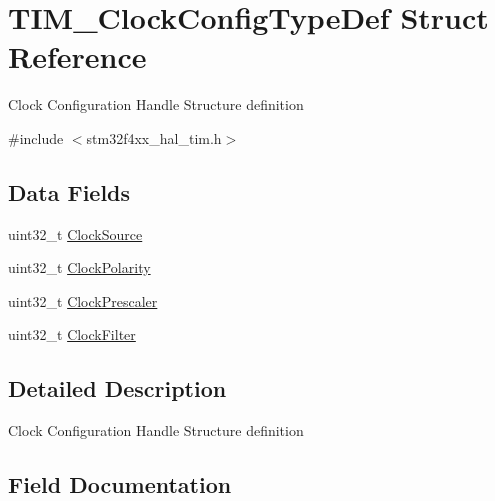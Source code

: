 \hypertarget{struct_t_i_m___clock_config_type_def}{}\section{T\+I\+M\+\_\+\+Clock\+Config\+Type\+Def Struct Reference}
\label{struct_t_i_m___clock_config_type_def}


Clock Configuration Handle Structure definition ~\newline
  




{\ttfamily \#include $<$stm32f4xx\+\_\+hal\+\_\+tim.\+h$>$}

\subsection*{Data Fields}
\begin{DoxyCompactItemize}
\item 
uint32\+\_\+t \mbox{\hyperlink{struct_t_i_m___clock_config_type_def_afe27815154e535b96e8fa1b4d2fdd596}{Clock\+Source}}
\item 
uint32\+\_\+t \mbox{\hyperlink{struct_t_i_m___clock_config_type_def_a765acd064e3a8fb99ec74ae5109fc5ec}{Clock\+Polarity}}
\item 
uint32\+\_\+t \mbox{\hyperlink{struct_t_i_m___clock_config_type_def_ab791f8fac403d508e1c53b6f27cf1f24}{Clock\+Prescaler}}
\item 
uint32\+\_\+t \mbox{\hyperlink{struct_t_i_m___clock_config_type_def_aed791f661f8bca36911e905631bebfa5}{Clock\+Filter}}
\end{DoxyCompactItemize}


\subsection{Detailed Description}
Clock Configuration Handle Structure definition ~\newline
 

\subsection{Field Documentation}
\mbox{\label{struct_t_i_m___clock_config_type_def_aed791f661f8bca36911e905631bebfa5}} 
